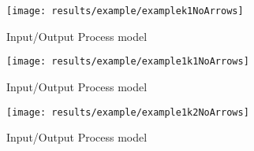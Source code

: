 \begin{figure}[H]
  \centering
  \texttt{[image: results/example/examplek1NoArrows]}
  \caption{Input\slash Output Process model}
    \label{fig:ioProcModel}
\end{figure}

\begin{figure}[H]
  \centering
  \texttt{[image: results/example/example1k1NoArrows]}
  \caption{Input\slash Output Process model}
    \label{fig:ioProcModel}
\end{figure}

\begin{figure}[H]
  \centering
  \texttt{[image: results/example/example1k2NoArrows]}
  \caption{Input\slash Output Process model}
    \label{fig:ioProcModel}
\end{figure}







